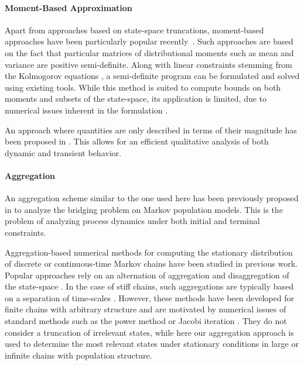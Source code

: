 \paragraph{Moment-Based Approximation}
Apart from approaches based on state-space truncations, moment-based approaches have been particularly popular recently~\parencite{ghusinga2017exact,dowdy2018bounds,kuntz2017rigorous,sakurai2017convex}.
Such approaches are based on the fact that particular matrices of distributional moments such as mean and variance are positive semi-definite.
Along with linear constraints stemming from the Kolmogorov equations \parencite{backenkohler2016generalized}, a semi-definite program can be formulated and solved using existing tools.
While this method is suited to compute bounds on both moments and subsets of the state-space, its application is limited, due to numerical issues inherent in the formulation \parencite{dowdy2018bounds}.

An approach where quantities are only described in terms of their magnitude has been proposed in \citet{ceska2019semi}. This allows for an efficient qualitative analysis of both dynamic and transient behavior.

\paragraph{Aggregation}
An aggregation scheme similar to the one used here has been previously proposed in \citet{backenkohler2020analysis} to analyze the bridging problem on Markov population models.
This is the problem of analyzing process dynamics under both initial and terminal constraints.

Aggregation-based numerical methods for computing the stationary distribution 
of discrete or continuous-time Markov chains have been studied in
previous work. Popular approaches rely on an alternation of aggregation and 
disaggregation of the state-space \parencite{stewart1994introduction,schweitzer1991survey}.
In the case of stiff chains, such aggregations are typically based on 
a separation of time-scales \parencite{cao1985iterative}.
However, these methods have been developed for finite chains with arbitrary structure and are motivated by numerical issues of standard methods such as 
the power method or Jacobi iteration \parencite{stewart1994introduction}.
They do not consider a truncation of irrelevant states, while
here our aggregation approach is used to determine the most relevant states
under stationary conditions in large or infinite chains with population structure.





